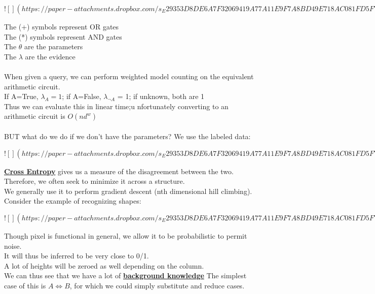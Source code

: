 \documentclass[../../lecture_notes.tex]{subfiles}
\begin{document}
\newpage
$![](https://paper-attachments.dropbox.com/s_E29353D8DE6A7F32069419A77A11E9F7A8BD49E718AC081FD5F77701FB86FF68_1590910293904_Screen+Shot+2020-05-31+at+12.30.28+AM.png)$
\newpage

\noindent The (+) symbols represent OR gates\\
The (*) symbols represent AND gates\\
The $\theta$ are the parameters\\
The $\lambda$ are the evidence\\
\\
When given a query, we can perform weighted model counting on the equivalent arithmetic circuit.\\
\indent If A=True, $\lambda_A = 1$; if A=False, $\lambda_{\neg A}$ = 1; if unknown, both are 1\\
Thus we can evaluate this in linear time;u nfortunately converting to an arithmetic circuit is $O(nd^w)$\\
\\
BUT what do we do if we don’t have the parameters?
We use the labeled data:

\newpage
$![](https://paper-attachments.dropbox.com/s_E29353D8DE6A7F32069419A77A11E9F7A8BD49E718AC081FD5F77701FB86FF68_1590911384850_Untitled+drawing+7.jpg)$
\newpage

\noindent \textbf{\underline{Cross Entropy}} gives us a measure of the disagreement between the two.\\
\indent Therefore, we often seek to minimize it across a structure.\\
We generally use it to perform gradient descent (nth dimensional hill climbing).\\
Consider the example of recognizing shapes:

\newpage
$![](https://paper-attachments.dropbox.com/s_E29353D8DE6A7F32069419A77A11E9F7A8BD49E718AC081FD5F77701FB86FF68_1590911957073_Untitled+drawing+8.jpg)$
\newpage

\noindent Though pixel is functional in general, we allow it to be probabilistic to permit noise.\\
It will thus be inferred to be very close to 0/1.\\
A lot of heights will be zeroed as well depending on the column.\\
We can thus see that we have a lot of \textbf{\underline{background knowledge}}
\indent The simplest case of this is $A \iff B$, for which we could simply substitute and reduce cases.
\end{document}
